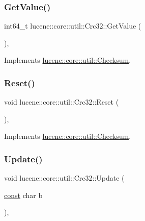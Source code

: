 \subsubsection{\texorpdfstring{Get\+Value()}{GetValue()}}
{\footnotesize\ttfamily int64\+\_\+t lucene\+::core\+::util\+::\+Crc32\+::\+Get\+Value (\begin{DoxyParamCaption}{ }\end{DoxyParamCaption})\hspace{0.3cm}{\ttfamily [inline]}, {\ttfamily [virtual]}}



Implements \mbox{\hyperlink{classlucene_1_1core_1_1util_1_1Checksum_aad9ea66e424c89f3600c36e66cfe508c}{lucene\+::core\+::util\+::\+Checksum}}.

\mbox{\label{classlucene_1_1core_1_1util_1_1Crc32_a4e73914945d7e498799bd444b3fb3b2f}} 
\subsubsection{\texorpdfstring{Reset()}{Reset()}}
{\footnotesize\ttfamily void lucene\+::core\+::util\+::\+Crc32\+::\+Reset (\begin{DoxyParamCaption}{ }\end{DoxyParamCaption})\hspace{0.3cm}{\ttfamily [inline]}, {\ttfamily [virtual]}}



Implements \mbox{\hyperlink{classlucene_1_1core_1_1util_1_1Checksum_a7e2d8a05474cad9ca3d67c1e770ffa29}{lucene\+::core\+::util\+::\+Checksum}}.

\mbox{\label{classlucene_1_1core_1_1util_1_1Crc32_a2d602ecc736c5cc5a0281bccc032b4fc}} 
\subsubsection{\texorpdfstring{Update()}{Update()}\hspace{0.1cm}{\footnotesize\ttfamily [1/2]}}
{\footnotesize\ttfamily void lucene\+::core\+::util\+::\+Crc32\+::\+Update (\begin{DoxyParamCaption}\item[{\mbox{\hyperlink{ZlibCrc32_8h_a2c212835823e3c54a8ab6d95c652660e}{const}} char}]{b }\end{DoxyParamCaption})\hspace{0.3cm}{\ttfamily [inline]}, {\ttfamily [virtual]}}



